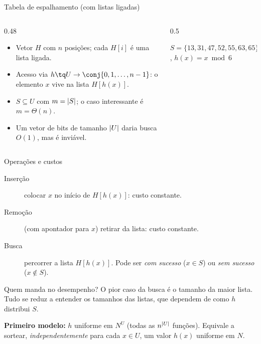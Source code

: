 \documentclass[aspectratio=169,11pt]{beamer}
\begin{document}
\begin{frame}{Tabela de espalhamento (com listas ligadas)}
  \begin{columns}[T]
    \begin{column}{0.48\textwidth}
      \begin{itemize}
      \item Vetor $H$ com $n$ posições; cada $H[i]$ é uma lista ligada.
      \item Acesso via $h\tq U\to\conj{0,1,\dots,n-1}$: o elemento $x$ vive na
        lista $H[h(x)]$.
      \item $S\subseteq U$ com $m=\lvert S\rvert$; o caso interessante é
        $m=\Theta(n)$.
      \item Um vetor de bits de tamanho $\lvert U\rvert$ daria busca $O(1)$, mas é
        inviável.
      \end{itemize}
    \end{column}
    \begin{column}{0.5\textwidth}
      \centering

      {\small $S=\{13,31,47,52,55,63,65\}$, $h(x)=x \bmod 6$}
    \end{column}
  \end{columns}
\end{frame}

\begin{frame}{Operações e custos}
  \begin{description}
  \item[Inserção] colocar $x$ no início de $H[h(x)]$: custo \alert{constante}.
  \item[Remoção] (com apontador para $x$) retirar da lista: custo constante.
  \item[Busca] percorrer a lista $H[h(x)]$. Pode ser \emph{com sucesso}
    ($x\in S$) ou \emph{sem sucesso} ($x\notin S$).
  \end{description}
  \pause
  \begin{block}{Quem manda no desempenho?}
    O pior caso da busca é o tamanho da \alert{maior lista}. Tudo se reduz a
    entender os tamanhos das listas, que dependem de como $h$ distribui $S$.
  \end{block}
  \pause
  \textbf{Primeiro modelo:} $h$ uniforme em $N^U$ (todas as $n^{\lvert U\rvert}$
  funções). Equivale a sortear, \emph{independentemente} para cada $x\in U$,
  um valor $h(x)$ uniforme em $N$.
\end{frame}
\end{document}

